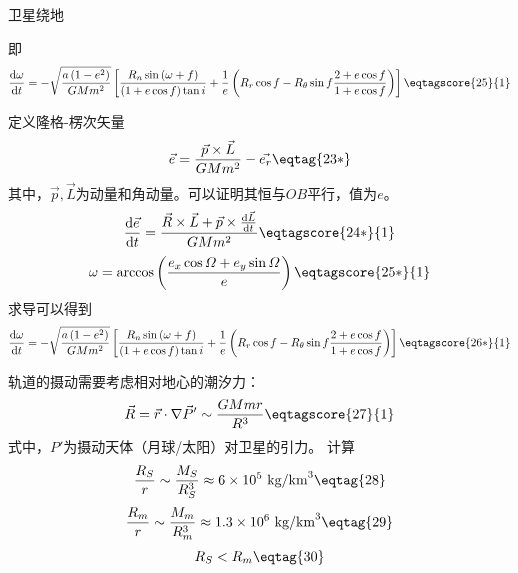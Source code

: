 \documentclass[answer]{cphos}
\begin{document}
\begin{problem}[50]{卫星绕地}
\begin{solution}
\begin{multisol}
\begin{equation}
	\end{equation}
	即
	\begin{equation}	
		\frac{\mathrm{d}\omega}{\mathrm{d}t}=-\sqrt{\frac{a\left(1 - e^2\right)}{GMm^2}}\left[\frac{R_n\sin\left(\omega+f\right)}{\left(1+e\cos f\right)\tan i}+\frac{1}{e}\left(R_r\cos f - R_{\theta}\sin f\frac{2+e\cos f}{1+ e\cos f}\right)\right]
		\eqtagscore{25}{1} \label{eq:1.6}
	\end{equation}	
	\item
	定义隆格-楞次矢量
	\begin{equation}
		\vec{e}=\frac{\vec{p}\times\vec{L}}{GMm^2}-\vec{e_r} \eqtag{23*}
	\end{equation}
	其中，$\vec{p},\vec{L}$为动量和角动量。可以证明其恒与$OB$平行，值为$e$。
	\begin{equation}
		\frac{\mathrm{d}\vec{e}}{\mathrm{d}t}=\frac{\vec{R}\times\vec{L}+\vec{p}\times\frac{\mathrm{d}\vec{L}}{\mathrm{d}t}}{GMm^2}
		\eqtagscore{24*}{1}
	\end{equation}
	\begin{equation}
		\omega=\arccos\left(\frac{e_x\cos\varOmega+e_y\sin\varOmega}{e}\right) \eqtagscore{25*}{1}
	\end{equation}
	求导可以得到
	\begin{equation}	
		\frac{\mathrm{d}\omega}{\mathrm{d}t}=-\sqrt{\frac{a\left(1 - e^2\right)}{GMm^2}}\left[\frac{R_n\sin\left(\omega+f\right)}{\left(1+e\cos f\right)\tan i}+\frac{1}{e}\left(R_r\cos f - R_{\theta}\sin f\frac{2+e\cos f}{1+ e\cos f}\right)\right]
		\eqtagscore{26*}{1}
	\end{equation}	
\end{multisol}

轨道的摄动需要考虑相对地心的潮汐力：
\begin{equation}
	\vec{R}=\vec{r}\cdot\nabla\vec{P}'\sim\frac{GMmr}{R^3} \eqtagscore{27}{1}
\end{equation}
式中，$P'$为摄动天体（月球/太阳）对卫星的引力。
计算
\begin{equation}
	\frac{R_S}{r} \sim \frac{M_S}{R_S^3}\approx6\times10^5 \text{~kg/km}^3 \eqtag{28}
\end{equation}
\begin{equation}
	\frac{R_m}{r} \sim \frac{M_m}{R_m^3}\approx1.3\times10^6 \text{~kg/km}^3 \eqtag{29}
\end{equation}
\begin{equation}
	R_S<R_m \eqtag{30}
\end{equation}


\end{solution}
\end{problem}
\end{document}
